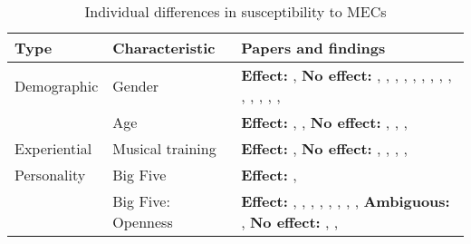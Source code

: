 \begin{table}[t!]
\centering
\scriptsize
\def\arraystretch{1.2}

\begin{threeparttable}
\caption{Individual differences in susceptibility to MECs}
\label{tab:rev-6}

\begin{tabular*}{\textwidth}{
    >{\raggedright}p{}
    >{\raggedright}p{}
    >{\raggedright\arraybackslash}p{}}

\hline

\textbf{Type} & \textbf{Characteristic} & \textbf{Papers and findings} \\ 

\hline
Demographic & Gender & 
    \textbf{Effect:} \textcite{benedek2011}, \textcite{panksepp1995} 
    \newline 
    \textbf{No effect:} \textcite{bannister2019}, \textcite{grewe2007}, \textcite{grewe2009a}, \textcite{guhn2007}, \textcite{goldstein1980}, \textcite{harrison2016}, \textcite{mlejnek2013}, \textcite{mori2014b}, \textcite{polo2017}, \textcite{rickard2004}, \textcite{silvia2011}, \textcite{starcke2019}, \textcite{sutherland2009}, \textcite{williams2018}, \textcite{zickfeld2019a} \\ 

\cline{2-3}   
& Age & 
    \textbf{Effect:} \textcite{baltes2014}, \textcite{mlejnek2013}, \textcite{williams2018} 
    \newline 
    \textbf{No effect:} \textcite{grewe2009a}, \textcite{mori2014b}, \textcite{starcke2019}, \textcite{zickfeld2019a} \\

\hline
Experiential & Musical training & 
    \textbf{Effect:} \textcite{beier2020}, \textcite{nusbaum2011} 
    \newline 
    \textbf{No effect:} \textcite{bannister2018}, \textcite{grewe2009a}, \textcite{guhn2007}, \textcite{polo2017}, \textcite{rickard2004} \\

\hline
Personality & Big Five & 
    \textbf{Effect:} \textcite{nusbaum2011}, \textcite{silvia2011} \\

\cline{2-3}
& Big Five: Openness & 
    \textbf{Effect:} \textcite{bannister2020a}, \textcite{colver2016}, \textcite{maruskin2012}, \textcite{mccrae2007}, \textcite{mori2015}, \textcite{nusbaum2011}, \textcite{silvia2011}, \textcite{silvia2015}, \textcite{sumpf2015} 
    \newline 
    \textbf{Ambiguous:} \textcite{mori2015}, \textcite{sumpf2015} 
    \newline 
    \textbf{No effect:} \textcite{mathis2017}, \textcite{rickard2004}, \textcite{starcke2019} \\ 
    

\end{tabular*}
\end{threeparttable}
\end{table}
